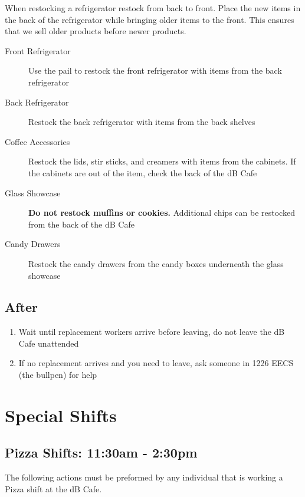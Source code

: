 \documentclass[12pt,onecolumn,letterpaper]{article}
\begin{document}
When restocking a refrigerator restock from back to front. Place the new items in the back of the refrigerator while bringing older items to the front. This ensures that we sell older products before newer products.
\begin{description}
\item [Front Refrigerator] Use the pail to restock the front refrigerator with items from the back refrigerator
\item [Back Refrigerator] Restock the back refrigerator with items from the back shelves
\item [Coffee Accessories] Restock the lids, stir sticks, and creamers with items from the cabinets. If the cabinets are out of the item, check the back of the dB Cafe
\item [Glass Showcase] \textbf{Do not restock muffins or cookies.} Additional chips can be restocked from the back of the dB Cafe
\item [Candy Drawers] Restock the candy drawers from the candy boxes underneath the glass showcase 
\end{description}
\subsection{After}
\begin{enumerate}
\item Wait until replacement workers arrive before leaving, do not leave the dB Cafe unattended
\item If no replacement arrives and you need to leave, ask someone in 1226 EECS (the bullpen) for help
\end{enumerate}
\section{Special Shifts}
\subsection{Pizza Shifts: 11:30am - 2:30pm}
The following actions must be preformed by any individual that is working a Pizza shift at the dB Cafe.
\end{document}
